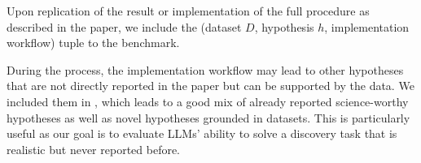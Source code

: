 

Upon replication of the result or implementation of the full procedure as described in the paper, we include the (dataset $D$, hypothesis $h$, implementation workflow) tuple to the benchmark.

During the process, the implementation workflow may lead to other hypotheses that are not directly reported in the paper but can be supported by the data.
We included them in \discoverybench{}, which leads to a good mix of already reported science-worthy hypotheses as well as novel
hypotheses grounded in datasets. This is particularly useful as our goal is to evaluate LLMs' ability to solve a discovery task that is realistic but never reported before.

